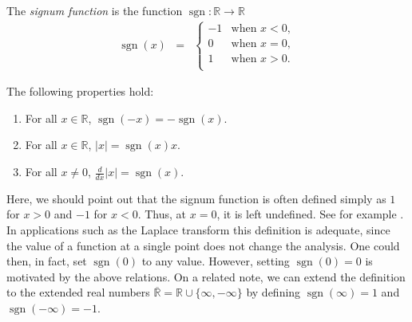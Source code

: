 \documentclass[12pt]{article}
\newcommand{\signum}[0]{\mathop{\mathrm{sgn}}}
\newcommand{\R}[0]{\mathbb{R}}
\begin{document}

The \emph{signum function} is the function $\signum\colon\R\to \R$
 \begin{eqnarray*}
 \signum (x) &=& \left\{ \begin {array}{ll} 
 -1 & \mbox{when}\,\, x<0, \\
  0 & \mbox{when}\,\, x=0,\\
  1 & \mbox{when}\,\, x>0. \\ \end{array} \right.
 \end{eqnarray*}
 
The following properties hold:
 \begin{enumerate}
 \item For all $x\in \R$, $\signum(-x) = -\signum(x).$
 \item For all $x\in \R$, $|x|=\signum(x) x.$
 \item For all $x\neq 0$, $\frac{d}{dx}|x|=\signum(x)$.
 \end{enumerate}
 
Here, we should point out that the signum function
is often defined simply as $1$ for $x>0$ and $-1$ for $x<0$.
Thus, at $x=0$, it is left undefined. See for example \cite{kreyszig93}.
In applications such as the Laplace transform this definition is adequate,
since the value of a function at a single point does not change the analysis.
One could then, in fact, set $\signum(0)$ to any value.
However, setting $\signum(0)=0$ is motivated by the above relations.
On a related note, we can extend the definition to the extended real numbers
$\overline{\mathbb{R}}=\mathbb{R}\cup\{\infty,-\infty\}$
by defining $\signum(\infty)=1$ and $\signum(-\infty)=-1$.
 
\end{document}
